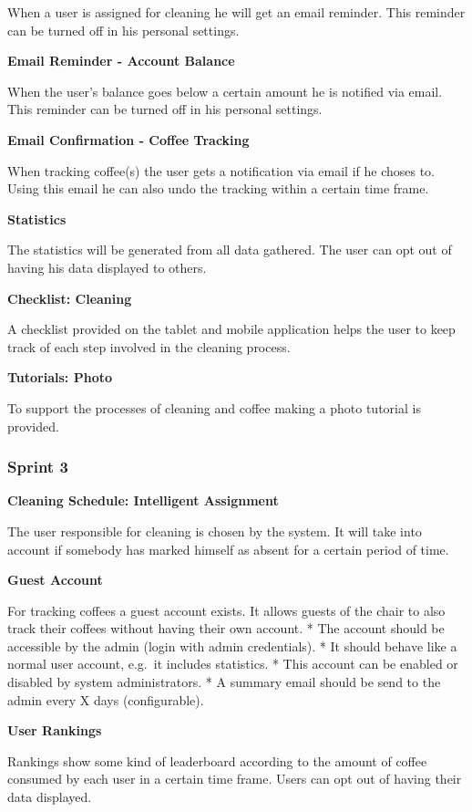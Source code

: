 When a user is assigned for cleaning he will get an email reminder. This
reminder can be turned off in his personal settings.

\textbf{Email Reminder - Account Balance}

When the user's balance goes below a certain amount he is notified via
email. This reminder can be turned off in his personal settings.

\textbf{Email Confirmation - Coffee Tracking}

When tracking coffee(s) the user gets a notification via email if he
choses to. Using this email he can also undo the tracking within a
certain time frame.

\textbf{Statistics}

The statistics will be generated from all data gathered. The user can
opt out of having his data displayed to others.

\textbf{Checklist: Cleaning}

A checklist provided on the tablet and mobile application helps the user
to keep track of each step involved in the cleaning process.

\textbf{Tutorials: Photo}

To support the processes of cleaning and coffee making a photo tutorial
is provided.

\subsubsection{Sprint 3}\label{sprint-3}

\textbf{Cleaning Schedule: Intelligent Assignment}

The user responsible for cleaning is chosen by the system. It will take
into account if somebody has marked himself as absent for a certain
period of time.

\textbf{Guest Account}

For tracking coffees a guest account exists. It allows guests of the
chair to also track their coffees without having their own account. *
The account should be accessible by the admin (login with admin
credentials). * It should behave like a normal user account, e.g.~it
includes statistics. * This account can be enabled or disabled by system
administrators. * A summary email should be send to the admin every X
days (configurable).

\textbf{User Rankings}

Rankings show some kind of leaderboard according to the amount of coffee
consumed by each user in a certain time frame. Users can opt out of
having their data displayed.

